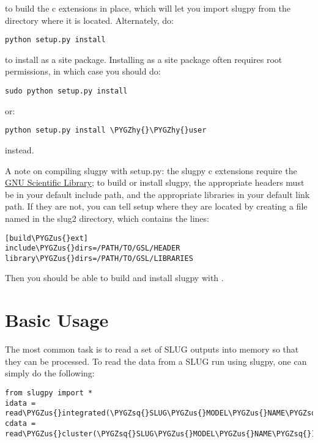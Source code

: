 \documentclass[letterpaper,10pt,english]{sphinxmanual}
\def\PYGZus{\char`\_}
\def\PYGZhy{\char`\-}
\def\PYGZsq{\char`\'}
\renewcommand\PYGZsq{\textquotesingle}
\begin{document}
to build the c extensions in place, which will let you import slugpy from the directory where it is located. Alternately, do:

\begin{Verbatim}[commandchars=\\\{\}]
python setup.py install
\end{Verbatim}

to install as a site package. Installing as a site package often requires root permissions, in which case you should do:

\begin{Verbatim}[commandchars=\\\{\}]
sudo python setup.py install
\end{Verbatim}

or:

\begin{Verbatim}[commandchars=\\\{\}]
python setup.py install \PYGZhy{}\PYGZhy{}user
\end{Verbatim}

instead.

A note on compiling slugpy with setup.py: the slugpy c extensions require the \href{http://www.gnu.org/software/gsl/}{GNU Scientific Library}; to build or install slugpy, the appropriate headers must be in your default include path, and the appropriate libraries in your default link path. If they are not, you can tell setup where they are located by creating a file named  in the slug2 directory, which contains the lines:

\begin{Verbatim}[commandchars=\\\{\}]
[build\PYGZus{}ext]
include\PYGZus{}dirs=/PATH/TO/GSL/HEADER
library\PYGZus{}dirs=/PATH/TO/GSL/LIBRARIES
\end{Verbatim}

Then you should be able to build and install slugpy with .


\section{Basic Usage}
\label{slugpy:basic-usage}
The most common task is to read a set of SLUG outputs into memory so that they can be processed. To read the data from a SLUG run using slugpy, one can simply do the following:

\begin{Verbatim}[commandchars=\\\{\}]
from slugpy import *
idata = read\PYGZus{}integrated(\PYGZsq{}SLUG\PYGZus{}MODEL\PYGZus{}NAME\PYGZsq{})
cdata = read\PYGZus{}cluster(\PYGZsq{}SLUG\PYGZus{}MODEL\PYGZus{}NAME\PYGZsq{})
\end{Verbatim}
\end{document}
